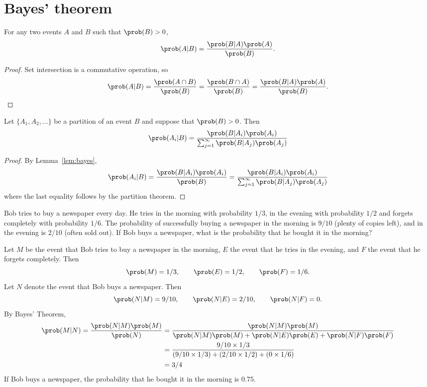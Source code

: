 \section{Bayes' theorem}

\begin{lemma}\label{lem:bayes}
For any two events $A$ and $B$ such that $\prob(B)>0$,
\[
\prob(A|B) = \frac{\prob(B|A)\prob(A)}{\prob(B)}.
\]
\end{lemma}

\begin{proof}
Set intersection is a commutative operation, so
\[
\prob(A|B) = \frac{\prob(A\cap B)}{\prob(B)} = \frac{\prob(B\cap A)}{\prob(B)} = \frac{\prob(B|A)\prob(A)}{\prob(B)}.
\]
\end{proof}

\begin{theorem}\label{thm:bayes}
Let $\{A_1,A_2,\ldots\}$ be a partition of an event $B$ and suppose that $\prob(B)>0$. Then
\[
\prob(A_i|B) = \frac{\prob(B|A_i)\prob(A_i)}{\sum_{j=1}^{\infty} \prob(B|A_j)\prob(A_j)}
\]
\end{theorem}

\begin{proof}
By Lemma~\ref{lem:bayes},
\[
\prob(A_i|B) 
	= \frac{\prob(B|A_i)\prob(A_i)}{\prob(B)}
	= \frac{\prob(B|A_i)\prob(A_i)}{\sum_{j=1}^{\infty} \prob(B|A_j)\prob(A_j)}
\]
where the last equality follows by the partition theorem.
\end{proof}

\begin{example}
Bob tries to buy a newspaper every day. He tries in the morning with probability $1/3$, in the evening with probability $1/2$ and forgets completely with probability $1/6$. The probability of successfully buying a newspaper in the morning is $9/10$ (plenty of copies left), and in the evening is $2/10$ (often sold out). If Bob buys a newspaper, what is the probability that he bought it in the morning?
\end{example}

\begin{solution}
Let $M$ be the event that Bob tries to buy a newspaper in the morning, $E$ the event that he tries in the evening, and $F$ the event that he forgets completely. Then
\[
\prob(M) = 1/3, \qquad \prob(E) = 1/2, \qquad \prob(F) = 1/6.
\]
Let $N$ denote the event that Bob buys a newspaper. Then
\[
\prob(N|M) = 9/10, \qquad \prob(N|E) = 2/10, \qquad \prob(N|F) = 0.
\]
By Bayes' Theorem,
\begin{align*}
\prob(M|N) = \frac{\prob(N|M)\prob(M)}{\prob(N)}
	& = \frac{\prob(N|M)\prob(M)}{\prob(N|M)\prob(M) + \prob(N|E)\prob(E) + \prob(N|F)\prob(F)} \\
	& = \frac{9/10\times 1/3}{(9/10\times 1/3) + (2/10\times 1/2) + (0\times 1/6)} \\
	& = 3/4
\end{align*}
If Bob buys a newspaper, the probability that he bought it in the morning is $0.75$.
\end{solution}


